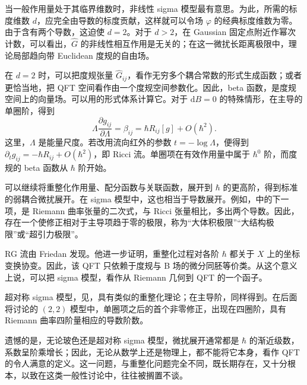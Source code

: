 当一般作用量处于其临界维数时，非线性 sigma 模型最有意思。为此，所需的标度维数 $d$，应完全由导数的标度贡献，这样就可以令场 $\varphi$ 的经典标度维数为零。由于含有两个导数，这迫使 $d=2$。对于 $d>2$，在 Gaussian 固定点附近作幂次计数，可以看出，$\widehat G$ 的非线性相互作用是无关的；在这一微扰长距离极限中，理论局部趋向带 Euclidean 度规的自由场。

在 $d=2$ 时，可以把度规张量 $\widehat G_{ij}$，看作无穷多个耦合常数的形式生成函数；或者更恰当地，把 QFT 空间看作由一个度规空间参数化。因此，beta 函数，是度规空间上的向量场。可以用的形式体系计算它。对于 $\mathrm{d}B=0$ 的特殊情形，在主导的单圈阶，得到
\begin{equation}\label{eq:3.79}
\Lambda\frac{\partial g_{ij}}{\partial\Lambda}
=\beta_{ij}=\hbar R_{ij}[g]+O(\hbar^2).
\end{equation}
这里，$\Lambda$ 是能量尺度。若改用流向红外的参数 $t=-\log\Lambda$，便得到 $\partial_tg_{ij}=-\hbar R_{ij}+O(\hbar^2)$，即 Ricci 流。单圈项在有效作用量中属于 $\hbar^0$ 阶，而度规的 beta 函数从 $\hbar$ 阶开始。

可以继续将重整化作用量、配分函数与关联函数，展开到 $\hbar$ 的更高阶，得到标准的弱耦合微扰展开。在 sigma 模型中，这也相当于导数展开。例如，中的下一项，是 Riemann 曲率张量的二次式，与 Ricci 张量相比，多出两个导数。因此，存在一个使修正相对于主导项趋于零的极限，称为“大体积极限”“大结构极限”或“超引力极限”。

RG 流由 Friedan 发现。他进一步证明，重整化过程对各阶 $\hbar$ 都关于 $X$ 上的坐标变换协变。因此，该 QFT 只依赖于度规与 B 场的微分同胚等价类。从这个意义上说，可以把 sigma 模型，看作从 Riemann 几何到 QFT 的一个函子。

超对称 sigma 模型，见，具有类似的重整化理论；在主导阶，同样得到。在后面将讨论的 $(2,2)$ 模型中，单圈项之后的首个非零修正，出现在四圈阶，具有 Riemann 曲率四阶量相应的导数阶数。

遗憾的是，无论玻色还是超对称 sigma 模型，微扰展开通常都是 $\hbar$ 的渐近级数，系数呈阶乘增长；因此，无论从数学上还是物理上，都不能将它本身，看作 QFT 的令人满意的定义。这一问题，与重整化问题完全不同，既长期存在，又十分根本，以致在这类一般性讨论中，往往被搁置不谈。

